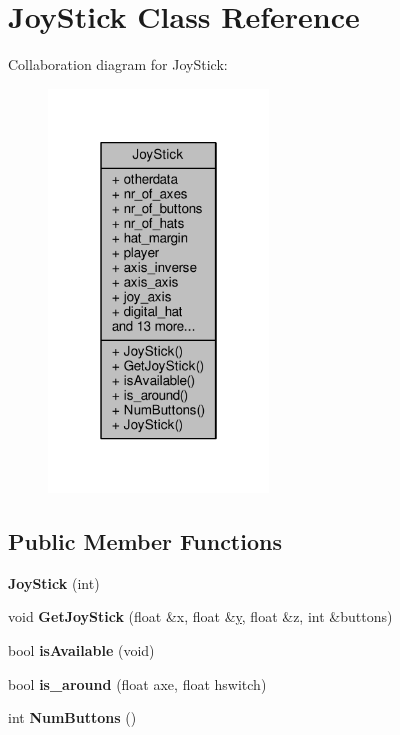 \hypertarget{classJoyStick}{}\section{Joy\+Stick Class Reference}
\label{classJoyStick}


Collaboration diagram for Joy\+Stick\+:
\nopagebreak
\begin{figure}[H]
\begin{center}
\leavevmode
\includegraphics[width=166pt]{da/dc3/classJoyStick__coll__graph}
\end{center}
\end{figure}
\subsection*{Public Member Functions}
\begin{DoxyCompactItemize}
\item 
{\bfseries Joy\+Stick} (int)\hypertarget{classJoyStick_ac74c06ba72a120baef194e3db5f5157e}{}\label{classJoyStick_ac74c06ba72a120baef194e3db5f5157e}

\item 
void {\bfseries Get\+Joy\+Stick} (float \&x, float \&\hyperlink{IceUtils_8h_aa7ffaed69623192258fb8679569ff9ba}{y}, float \&z, int \&buttons)\hypertarget{classJoyStick_a52e37162d5e3f50f0c0d6d9caacee9f1}{}\label{classJoyStick_a52e37162d5e3f50f0c0d6d9caacee9f1}

\item 
bool {\bfseries is\+Available} (void)\hypertarget{classJoyStick_a46f7baff52344440272a9668511cfbdc}{}\label{classJoyStick_a46f7baff52344440272a9668511cfbdc}

\item 
bool {\bfseries is\+\_\+around} (float axe, float hswitch)\hypertarget{classJoyStick_af2fb230a64349fd476e6ec5770a5988d}{}\label{classJoyStick_af2fb230a64349fd476e6ec5770a5988d}

\item 
int {\bfseries Num\+Buttons} ()\hypertarget{classJoyStick_a1421a9c44206cf3d9aed909e04d6a317}{}\label{classJoyStick_a1421a9c44206cf3d9aed909e04d6a317}

\end{DoxyCompactItemize}
